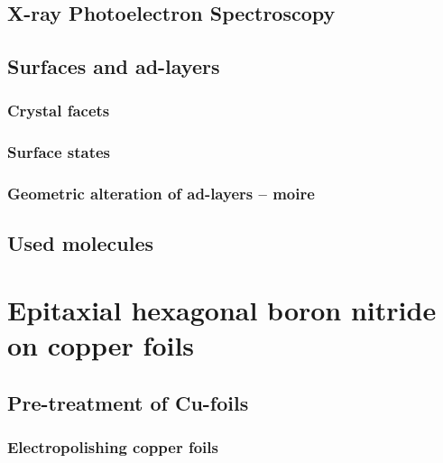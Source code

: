 \documentclass[10pt,a4paper,twoside
,BCOR=8mm				%
,headings=normal		%
,headsepline			%
,footsepline			%
]{scrbook}
\begin{document}
  \section{\textbf{X}-ray \textbf{P}hotoelectron \textbf{S}pectroscopy}
	
  \section{Surfaces and ad-layers}
     \subsection{Crystal facets}
        
     \subsection{Surface states}
		
     \subsection{Geometric alteration of ad-layers -- moire}
		
  \section{Used molecules}
    
\chapter{Epitaxial hexagonal boron nitride on copper foils}
\section{Pre-treatment of Cu-foils}
  \subsection{Electropolishing copper foils}
  
%      
%      
\end{document}
